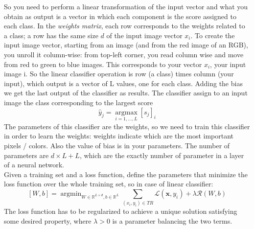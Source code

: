 So you need to perform a linear transformation of the input vector and what you obtain as output is a vector in which each component is the score assigned to each class. In the \textit{weights matrix}, each row corresponds to the weights related to a class; a row has the same size $d$ of the input image vector $x_i$. To create the input image vector, starting from an image (and from the red image of an RGB), you unroll it column-wise: from top-left corner, you read column wise and move from red to green to blue images. 
This corresponds to your vector $x_i$, your input image i. So the linear classifier operation is row (a class) times column (your input), which output is a vector of L values, one for each class. Adding the bias we get the last output of the classifier as results. The classifier assign to an input image the class corresponding to the largest score 
$$
\hat{y}_{j}=\underset{i=1, \ldots, L}{\operatorname{argmax}}\left[s_{j}\right]_{i}
$$
The parameters of this classifier are the weights, so we need to train this classifier in order to learn the weights: weights indicate which are the most important pixels / colors. Also the value of bias is in your parameters. The number of parameters are $d \times L + L$, which are the exactly number of parameter in a layer of a neural network. \\
Given a training set and a loss function, define the parameters that minimize the loss function over the whole training set, so in case of linear classifier: 
$$
[W, b]=\operatorname{argmin}_{W \in \mathbb{R}^{L \times d}, b \in \mathbb{R}^{L}} \sum_{\left(x_{i}, y_{i}\right) \in T R} \mathcal{L}\left(\boldsymbol{x}, y_{i}\right)+\lambda \mathcal{R}(W, b)
$$
The loss function has to be regularized to achieve a unique solution satisfying some desired property, where $\lambda > 0$ is a parameter balancing the two terms. \\ 
